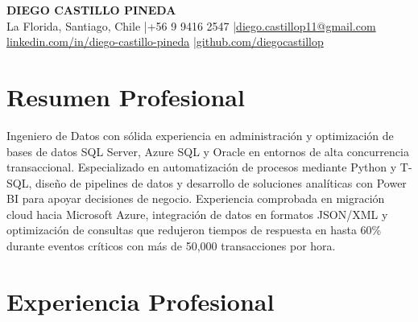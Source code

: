 \documentclass[11pt,letterpaper]{article}
\begin{document}
\begin{center}
{\fontsize{16}{19}\selectfont\textbf{\MakeUppercase{Diego Castillo Pineda}}}\\[4pt]
{\small La Florida, Santiago, Chile \quad|\quad +56 9 9416 2547 \quad|\quad \href{mailto:diego.castillop11@gmail.com}{diego.castillop11@gmail.com}\\
\href{https://linkedin.com/in/diego-castillo-pineda}{linkedin.com/in/diego-castillo-pineda} \quad|\quad \href{https://github.com/diegocastillop}{github.com/diegocastillop}}
\end{center}

\section{Resumen Profesional}
Ingeniero de Datos con sólida experiencia en administración y optimización de bases de datos SQL Server, Azure SQL y Oracle en entornos de alta concurrencia transaccional. Especializado en automatización de procesos mediante Python y T-SQL, diseño de pipelines de datos y desarrollo de soluciones analíticas con Power BI para apoyar decisiones de negocio. Experiencia comprobada en migración cloud hacia Microsoft Azure, integración de datos en formatos JSON/XML y optimización de consultas que redujeron tiempos de respuesta en hasta 60\% durante eventos críticos con más de 50,000 transacciones por hora.

\section{Experiencia Profesional}
\end{document}
